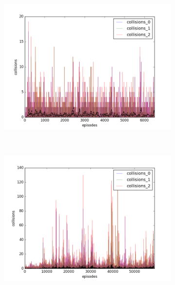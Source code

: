 \begin{figure}[t]
  \vspace{\graphspacing}
  \begin{subfigure}[t]{\figscale\linewidth}
    \hspace*{-2.75cm}
    \includegraphics[width=1.5\textwidth]
    {../results/dqn_1vs2/collisions.png}
    \label{fig:dqn-1vs2-collisions}
  \end{subfigure}
  ~
  \begin{subfigure}[t]{\figscale\linewidth}
    \hspace*{-1.4cm}
    \includegraphics[width=1.5\textwidth]
    {../results/ddpg_1vs2/collisions.png}
    \label{fig:ddpg-1vs2-collisions}
  \end{subfigure}
  ~
  \begin{subfigure}[t]{\figscale\linewidth}

\end{subfigure}
\end{figure}
